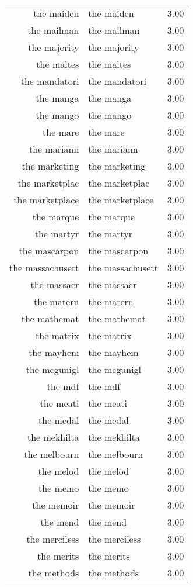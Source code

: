 \begin{table}[ht]
\begin{tabular}{rlr}
  the maiden & the maiden & 3.00 \\ 
  the mailman & the mailman & 3.00 \\ 
  the majority & the majority & 3.00 \\ 
  the maltes & the maltes & 3.00 \\ 
  the mandatori & the mandatori & 3.00 \\ 
  the manga & the manga & 3.00 \\ 
  the mango & the mango & 3.00 \\ 
  the mare & the mare & 3.00 \\ 
  the mariann & the mariann & 3.00 \\ 
  the marketing & the marketing & 3.00 \\ 
  the marketplac & the marketplac & 3.00 \\ 
  the marketplace & the marketplace & 3.00 \\ 
  the marque & the marque & 3.00 \\ 
  the martyr & the martyr & 3.00 \\ 
  the mascarpon & the mascarpon & 3.00 \\ 
  the massachusett & the massachusett & 3.00 \\ 
  the massacr & the massacr & 3.00 \\ 
  the matern & the matern & 3.00 \\ 
  the mathemat & the mathemat & 3.00 \\ 
  the matrix & the matrix & 3.00 \\ 
  the mayhem & the mayhem & 3.00 \\ 
  the mcgunigl & the mcgunigl & 3.00 \\ 
  the mdf & the mdf & 3.00 \\ 
  the meati & the meati & 3.00 \\ 
  the medal & the medal & 3.00 \\ 
  the mekhilta & the mekhilta & 3.00 \\ 
  the melbourn & the melbourn & 3.00 \\ 
  the melod & the melod & 3.00 \\ 
  the memo & the memo & 3.00 \\ 
  the memoir & the memoir & 3.00 \\ 
  the mend & the mend & 3.00 \\ 
  the merciless & the merciless & 3.00 \\ 
  the merits & the merits & 3.00 \\ 
  the methods & the methods & 3.00 \\ 

\end{tabular}
\end{table}
